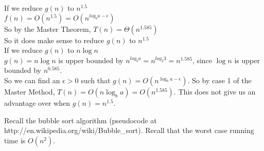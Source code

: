 \documentclass[addpoints]{exam}
\begin{document}
\begin{questions}
\begin{parts}
If we reduce $g(n)$ to $n^{1.5}$\\
$f(n) =  O(n^{1.5})=O(n^{log_b a - \epsilon})$\\
So by the Master Theorem, $T(n) = \Theta(n^{1.585})$\\
So it does make sense to reduce $g(n)$ to $n^{1.5}$\\

If we reduce $g(n)$ to $n \log n$\\
$g(n)= n\log n$ is upper bounded by $n^{log_b a} = n^{log_2 3} =n^{1.585}$, since $\log n$ is upper bounded by $n^{0.585}$.\\
So we can find an $\epsilon > 0$ such that $g(n) =O(n^{\log_b a-\epsilon})$.
So by case 1 of the Master Method, $T(n) = O(n{\log_b a}) = O(n^{1.585})$.
This does not give us an advantage over when $g(n)=n^{1.5}$.
\end{parts}

\color{qcolor}
Recall the bubble sort algorithm (pseudocode at {\sf http://en.wikipedia.org/wiki/Bubble\_sort}). Recall that the worst case running time is $O(n^2)$.

\color{acolor}
\begin{parts}

\end{parts}
\end{questions}
\end{document}
